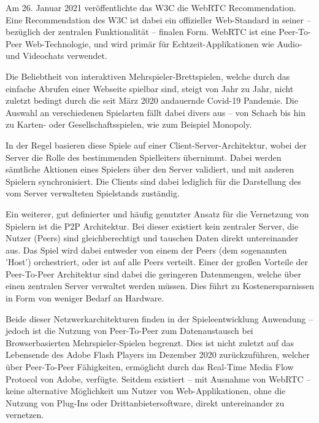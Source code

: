 Am 26. Januar 2021 veröffentlichte das \ac{W3C} die \ac{WebRTC} Recommendation. Eine Recommendation des \acs{W3C} ist dabei ein offizieller Web-Standard in seiner -- bezüglich der zentralen Funktionalität -- finalen Form. \acs{WebRTC} ist eine Peer-To-Peer Web-Technologie, und wird primär für Echtzeit-Applikationen wie Audio- und Videochats verwendet.\par

Die Beliebtheit von interaktiven Mehrspieler-Brettspielen, welche durch das einfache Abrufen einer Webseite spielbar sind, steigt von Jahr zu Jahr, nicht zuletzt bedingt durch die seit März 2020 andauernde Covid-19 Pandemie. Die Auswahl an verschiedenen Spielarten fällt dabei divers aus -- von Schach bis hin zu Karten- oder Gesellschaftsspielen, wie zum Beispiel Monopoly.\par

In der Regel basieren diese Spiele auf einer Client-Server-Architektur, wobei der Server die Rolle des bestimmenden Spielleiters übernimmt. Dabei werden sämtliche Aktionen eines Spielers über den Server validiert, und mit anderen Spielern synchronisiert. Die Clients sind dabei lediglich für die Darstellung des vom Server verwalteten Spielstands zuständig.\cite{bura2012}\par

Ein weiterer, gut definierter und häufig genutzter Ansatz für die Vernetzung von Spielern ist die \acs{P2P} Architektur. Bei dieser existiert kein zentraler Server, die Nutzer (Peers) sind gleichberechtigt und tauschen Daten direkt untereinander aus. Das Spiel wird dabei entweder von einem der Peers (dem sogenannten 'Host') orchestriert, oder ist auf alle Peers verteilt. Einer der großen Vorteile der Peer-To-Peer Architektur sind dabei die geringeren Datenmengen, welche über einen zentralen Server verwaltet werden müssen. Dies führt zu Kostenersparnissen in Form von weniger Bedarf an Hardware.\par

Beide dieser Netzwerkarchitekturen finden in der Spieleentwicklung Anwendung -- jedoch ist die Nutzung von Peer-To-Peer zum Datenaustausch bei Browserbasierten Mehrspieler-Spielen begrenzt. Dies ist nicht zuletzt auf das Lebensende des Adobe Flash Players im Dezember 2020 zurückzuführen, welcher über Peer-To-Peer Fähigkeiten, ermöglicht durch das Real-Time Media Flow Protocol von Adobe, verfügte. Seitdem existiert -- mit Ausnahme von \acs{WebRTC} -- keine alternative Möglichkeit um Nutzer von Web-Applikationen, ohne die Nutzung von Plug-Ins oder Drittanbietersoftware, direkt untereinander zu vernetzen.\par

